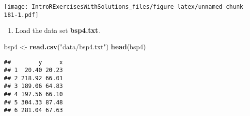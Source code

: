 \documentclass[]{article}
\newenvironment{Shaded}{\begin{snugshade}}{\end{snugshade}}
\newcommand{\KeywordTok}[1]{\textcolor[rgb]{0.13,0.29,0.53}{\textbf{#1}}}
\newcommand{\DataTypeTok}[1]{\textcolor[rgb]{0.13,0.29,0.53}{#1}}
\newcommand{\DecValTok}[1]{\textcolor[rgb]{0.00,0.00,0.81}{#1}}
\newcommand{\FloatTok}[1]{\textcolor[rgb]{0.00,0.00,0.81}{#1}}
\newcommand{\StringTok}[1]{\textcolor[rgb]{0.31,0.60,0.02}{#1}}
\newcommand{\OperatorTok}[1]{\textcolor[rgb]{0.81,0.36,0.00}{\textbf{#1}}}
\newcommand{\NormalTok}[1]{#1}
\providecommand{\tightlist}{%
  \setlength{\itemsep}{0pt}\setlength{\parskip}{0pt}}
\begin{document}
\begin{Shaded}
\end{Shaded}

\texttt{[image: IntroRExercisesWithSolutions\_files/figure-latex/unnamed-chunk-181-1.pdf]}

\begin{enumerate}
\def\labelenumi{\arabic{enumi}.}
\setcounter{enumi}{1}
\tightlist
\item
  Load the data set \textbf{bsp4.txt}.
\end{enumerate}

\begin{Shaded}
\begin{Highlighting}[]
\NormalTok{bsp4 <-}\StringTok{ }\KeywordTok{read.csv}\NormalTok{(}\StringTok{"data/bsp4.txt"}\NormalTok{)}
\KeywordTok{head}\NormalTok{(bsp4)}
\end{Highlighting}
\end{Shaded}

\begin{verbatim}
##        y     x
## 1  20.40 20.23
## 2 218.92 66.01
## 3 189.06 64.83
## 4 197.56 66.10
## 5 304.33 87.48
## 6 281.04 67.63
\end{verbatim}
\end{document}
